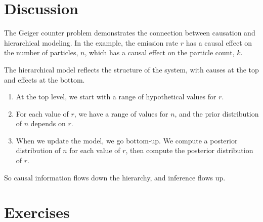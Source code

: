 \documentclass[12pt]{book}
\theoremstyle{exercise}
\begin{document}
\section{Discussion}

The Geiger counter problem demonstrates the connection between
causation and hierarchical modeling.  In the example, the
emission rate $r$ has a causal effect on the number of particles,
$n$, which has a causal effect on the particle count, $k$.

The hierarchical model reflects the structure of the
system, with causes at the top and effects at the bottom.

\begin{enumerate}

\item At the top level, we start with a range of hypothetical
values for $r$.

\item For each value of $r$, we have a range of values for $n$,
and the prior distribution of $n$ depends on $r$.

\item When we update the model, we go bottom-up.  We compute
a posterior distribution of $n$ for each value of $r$, then
compute the posterior distribution of $r$.

\end{enumerate}

So causal information flows down the hierarchy, and inference flows
up.


\section{Exercises}
\end{document}
